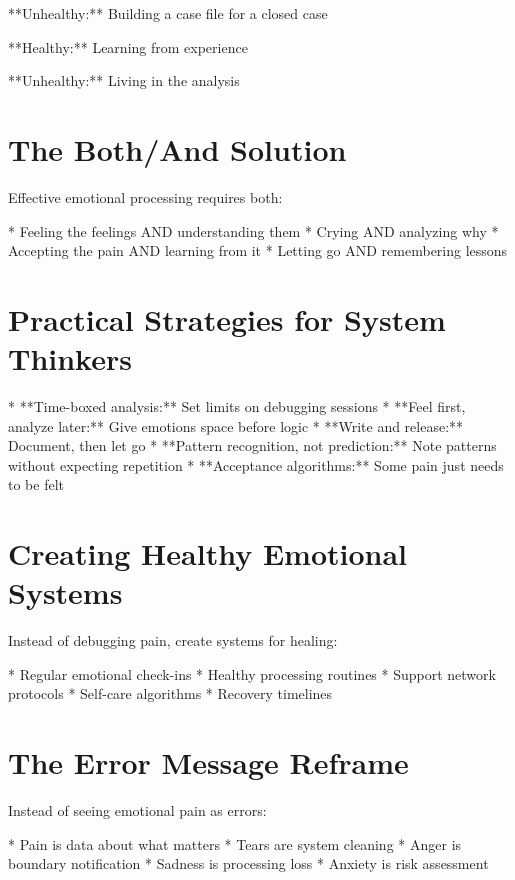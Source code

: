 \documentclass[12pt,oneside]{book}
\begin{document}
                **Unhealthy:** Building a case file for a closed case

**Healthy:** Learning from experience

                **Unhealthy:** Living in the analysis

\section{The Both/And Solution}

Effective emotional processing requires both:

                    * Feeling the feelings AND understanding them
                    * Crying AND analyzing why
                    * Accepting the pain AND learning from it
                    * Letting go AND remembering lessons

\section{Practical Strategies for System Thinkers}

                    * **Time-boxed analysis:** Set limits on debugging sessions
                    * **Feel first, analyze later:** Give emotions space before logic
                    * **Write and release:** Document, then let go
                    * **Pattern recognition, not prediction:** Note patterns without expecting repetition
                    * **Acceptance algorithms:** Some pain just needs to be felt

\section{Creating Healthy Emotional Systems}

Instead of debugging pain, create systems for healing:

                    * Regular emotional check-ins
                    * Healthy processing routines
                    * Support network protocols
                    * Self-care algorithms
                    * Recovery timelines

\section{The Error Message Reframe}

Instead of seeing emotional pain as errors:

                    * Pain is data about what matters
                    * Tears are system cleaning
                    * Anger is boundary notification
                    * Sadness is processing loss
                    * Anxiety is risk assessment
\end{document}

